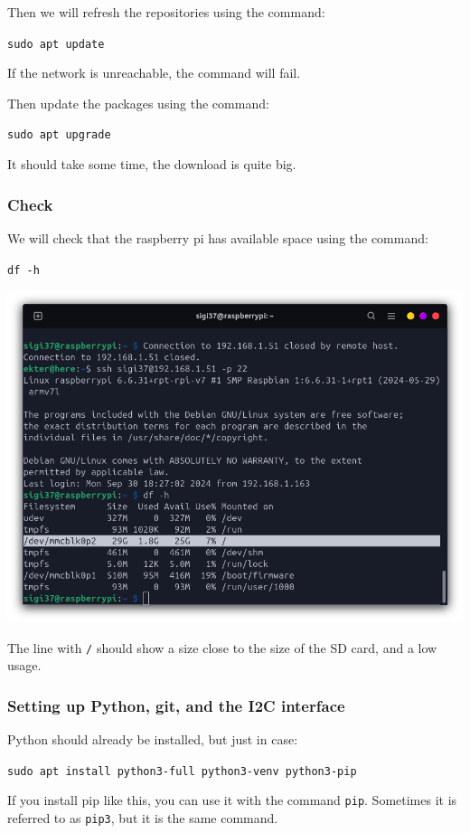 \documentclass{article}
\begin{document}
Then we will refresh the repositories using the command:

\texttt{sudo apt update}

If the network is unreachable, the command will fail.

Then update the packages using the command:

\texttt{sudo apt upgrade}

It should take some time, the download is quite big.

\subsubsection{Check}

We will check that the raspberry pi has available space using the command:

\texttt{df -h}

\includegraphics[scale=0.37]{img/df_h.png}

The line with \texttt{/} should show a size close to the size of the SD card, and a low usage.

\subsubsection{Setting up Python, git, and the I2C interface}

Python should already be installed, but just in case:

\texttt{sudo apt install python3-full python3-venv python3-pip}

If you install pip like this, you can use it with the command \texttt{pip}.
Sometimes it is referred to as \texttt{pip3}, but it is the same command.
\end{document}
